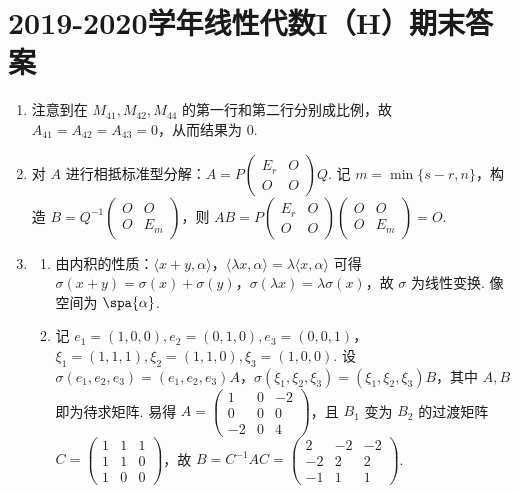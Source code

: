 \section{2019-2020学年线性代数I（H）期末答案}

\begin{enumerate}
    \item 注意到在 $M_{41},M_{42},M_{44}$ 的第一行和第二行分别成比例，故 $A_{41}=A_{42}=A_{43}=0$，从而结果为 $0$.
    \item 对 $A$ 进行相抵标准型分解：$A=P\begin{pmatrix}E_{r}&O\\ O&O\end{pmatrix}Q$. 记 $m=\min\{s-r,n\}$，构造 $B=Q^{-1}\begin{pmatrix}O&O\\ O&E_m\end{pmatrix}$，则 $AB=P\begin{pmatrix}E_{r}&O\\ O&O\end{pmatrix}\begin{pmatrix}O&O\\ O&E_m\end{pmatrix}=O$.
    \item \begin{enumerate}
        \item 由内积的性质：$\langle x+y, \alpha \rangle$，$\langle \lambda x, \alpha \rangle = \lambda \langle x, \alpha \rangle$ 可得 $\sigma(x+y)=\sigma(x)+\sigma(y)$，$\sigma(\lambda x)=\lambda \sigma(x)$，故 $\sigma$ 为线性变换. 像空间为 $\spa\{\alpha\}$.
        \item 记 $e_1=(1,0,0), e_2=(0,1,0), e_3=(0,0,1)$，$\xi_1=(1,1,1), \xi_2=(1,1,0), \xi_3=(1,0,0)$. 设 $\sigma(e_1,e_2,e_3)=(e_1,e_2,e_3)A$，$\sigma(\xi_1,\xi_2,\xi_3)=(\xi_1,\xi_2,\xi_3)B$，其中 $A,B$ 即为待求矩阵. 易得 $A=\begin{pmatrix} 1&0&-2 \\ 0&0&0 \\ -2&0&4 \end{pmatrix}$，且 $B_1$ 变为 $B_2$ 的过渡矩阵 $C=\begin{pmatrix}1&1&1\\ 1&1&0\\ 1&0&0\end{pmatrix}$，故 $B=C^{-1}AC=\begin{pmatrix}2&-2&-2\\ -2&2&2\\ -1&1&1\end{pmatrix}$.
    \end{enumerate}


\end{enumerate}
